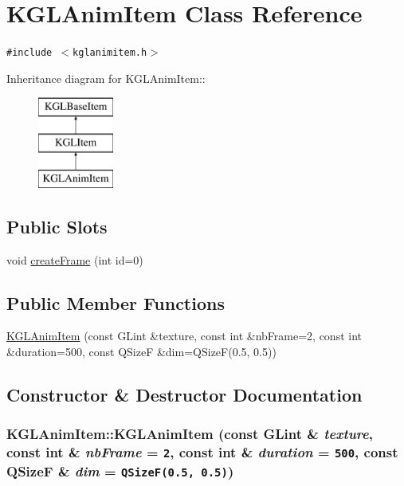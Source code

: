 \hypertarget{class_k_g_l_anim_item}{
\section{KGLAnimItem Class Reference}
\label{class_k_g_l_anim_item}
}
{\tt \#include $<$kglanimitem.h$>$}

Inheritance diagram for KGLAnimItem::\begin{figure}[H]
\begin{center}
\leavevmode
\includegraphics[height=3cm]{class_k_g_l_anim_item}
\end{center}
\end{figure}
\subsection*{Public Slots}
\begin{CompactItemize}
\item 
void \hyperlink{class_k_g_l_anim_item_6b61e41500543929dda03b741240cfb5}{createFrame} (int id=0)
\end{CompactItemize}
\subsection*{Public Member Functions}
\begin{CompactItemize}
\item 
\hyperlink{class_k_g_l_anim_item_59946ab271701727f87533abf1bde4f4}{KGLAnimItem} (const GLint \&texture, const int \&nbFrame=2, const int \&duration=500, const QSizeF \&dim=QSizeF(0.5, 0.5))
\end{CompactItemize}


\subsection{Constructor \& Destructor Documentation}
\hypertarget{class_k_g_l_anim_item_59946ab271701727f87533abf1bde4f4}{
\subsubsection[{KGLAnimItem}]{\setlength{\rightskip}{0pt plus 5cm}KGLAnimItem::KGLAnimItem (const GLint \& {\em texture}, \/  const int \& {\em nbFrame} = {\tt 2}, \/  const int \& {\em duration} = {\tt 500}, \/  const QSizeF \& {\em dim} = {\tt QSizeF(0.5,~0.5)})}}
\label{class_k_g_l_anim_item_59946ab271701727f87533abf1bde4f4}





